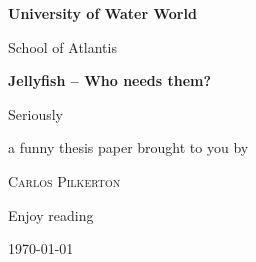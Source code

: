 \documentclass{article}
\begin{document}
\pagestyle{empty}
\begin{center}
	\LARGE
	{\bfseries University of Water World\par}
	School of Atlantis\par
	\vspace{4cm}
	{\huge\bfseries Jellyfish -- Who needs them?\par}
	{\small Seriously}
	\vspace{3cm}
	\par
\end{center}
	\hfill\begin{minipage}{.5\linewidth}
		\normalsize
		a funny thesis paper brought to you by\par
		\textsc{Carlos Pilkerton}\par
		Enjoy reading
	\end{minipage}
	\vfill

	\centering
	\today
\end{document}
